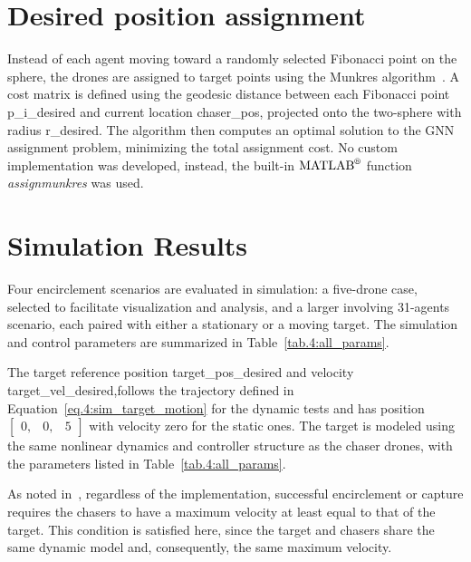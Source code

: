 \section{Desired position assignment}

Instead of each agent moving toward a randomly selected Fibonacci point on the sphere, the drones are assigned to target points using the Munkres algorithm~\cite{3800020109}. A cost matrix is defined using the geodesic distance between each Fibonacci point \gls{p_i_desired} and current location \gls{chaser_pos}, projected onto the two-sphere with radius \gls{r_desired}. The algorithm then computes an optimal solution to the \gls{GNN} assignment problem, minimizing the total assignment cost. No custom implementation was developed, instead, the built-in \(\text{MATLAB}^\text{\textregistered}\) \cite{MATLAB:R2024a} function \textit{assignmunkres} \cite{MATLAB_assignmunkres} was used.

\section{Simulation Results} \label{sec.4:simulations}

Four encirclement scenarios are evaluated in simulation: a five-drone case, selected to facilitate visualization and analysis, and a larger involving 31-agents scenario, each paired with either a stationary or a moving target. The simulation and control parameters are summarized in Table~\ref{tab.4:all_params}.

The target reference position \gls{target_pos_desired} and velocity \gls{target_vel_desired},follows the trajectory defined in Equation~\eqref{eq.4:sim_target_motion} for the dynamic tests and has position $\begin{bmatrix} 0,& 0,& 5\end{bmatrix}$ with velocity zero for the static ones. The target is modeled using the same nonlinear dynamics and controller structure as the chaser drones, with the parameters listed in Table~\ref{tab.4:all_params}. 

As noted in~\cite{mycielskiTheoriesPursuitEvasion1988}, regardless of the implementation, successful encirclement or capture requires the chasers to have a maximum velocity at least equal to that of the target. This condition is satisfied here, since the target and chasers share the same dynamic model and, consequently, the same maximum velocity.

